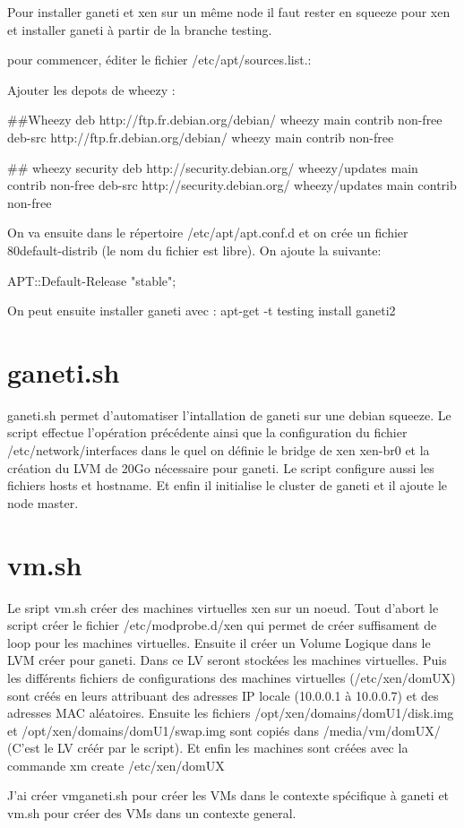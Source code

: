
Pour installer ganeti et xen sur un même node il faut rester en squeeze pour xen et installer ganeti à partir  de la branche testing.

pour commencer, éditer le fichier /etc/apt/sources.list.:

Ajouter les depots de wheezy :

##Wheezy
deb http://ftp.fr.debian.org/debian/ wheezy main contrib non-free
deb-src http://ftp.fr.debian.org/debian/ wheezy main contrib non-free

## wheezy security
deb http://security.debian.org/ wheezy/updates main contrib non-free
deb-src http://security.debian.org/ wheezy/updates main contrib non-free


On va ensuite dans le répertoire /etc/apt/apt.conf.d et on crée un fichier 80default-distrib (le nom du fichier est libre). On ajoute la  suivante:

APT::Default-Release "stable";

On peut ensuite installer ganeti avec :
apt-get -t testing install ganeti2

\section {ganeti.sh}

ganeti.sh permet d'automatiser l'intallation de ganeti sur une debian squeeze.
Le script effectue l'opération précédente ainsi que la configuration du fichier /etc/network/interfaces dans le quel on définie le bridge de xen xen-br0 et la création du LVM de 20Go nécessaire pour ganeti.
Le script configure aussi les fichiers hosts et hostname.
Et enfin il initialise le cluster de ganeti et il ajoute le node master.

\section {vm.sh}

Le sript vm.sh créer des machines virtuelles xen sur un noeud.
Tout d'abort le script créer le fichier /etc/modprobe.d/xen qui permet de créer suffisament de loop pour les machines virtuelles.
Ensuite il créer un Volume Logique dans le LVM créer pour ganeti. Dans ce LV seront stockées les machines virtuelles.
Puis les différents fichiers de configurations des machines virtuelles (/etc/xen/domUX) sont créés en leurs attribuant des adresses IP locale (10.0.0.1 à 10.0.0.7) et des adresses MAC aléatoires.
Ensuite les fichiers  /opt/xen/domains/domU1/disk.img et /opt/xen/domains/domU1/swap.img sont copiés dans /media/vm/domUX/ (C'est le LV créér par le script).
Et enfin les machines sont créées avec la commande xm create /etc/xen/domUX

J'ai créer vmganeti.sh pour créer les VMs dans le contexte spécifique à ganeti et vm.sh pour créer des VMs dans un contexte general.

